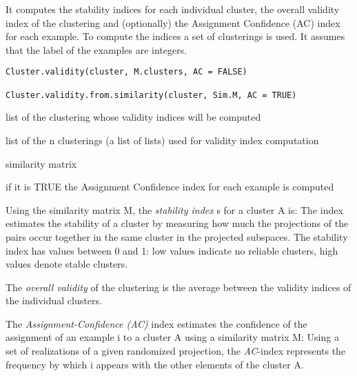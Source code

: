 \documentclass{article}
\begin{document}
\begin{Description}\relax
It computes the stability indices for each individual cluster,
the overall validity index of the clustering and (optionally) the Assignment Confidence (AC) index for each example.
To compute the indices a set of clusterings is used.
It assumes that the label of the examples are integers.
\end{Description}
\begin{Usage}
\begin{verbatim}
Cluster.validity(cluster, M.clusters, AC = FALSE)

Cluster.validity.from.similarity(cluster, Sim.M, AC = TRUE)
\end{verbatim}
\end{Usage}
\begin{Arguments}
\begin{ldescription}
\item[\code{cluster}] list of the  clustering whose validity indices will be computed 
\item[\code{M.clusters}] list of the n clusterings (a list of lists) used for validity index computation 
\item[\code{Sim.M}] similarity matrix
\item[\code{AC}] if it is TRUE the Assignment Confidence index for each example is computed
\end{ldescription}
\end{Arguments}
\begin{Details}\relax
Using the  similarity matrix M, 
the \emph{stability index} s for a cluster A is:
The index  estimates the stability of a cluster  by measuring how much  the projections 
of the pairs  occur together in the same cluster in the projected subspaces. 
The stability index has values between 0 and 1: low values indicate no reliable clusters,
high values denote stable clusters. 

The \emph{overall validity} of the clustering is the average between the validity indices of the individual clusters.

The \emph{Assignment-Confidence (AC)} index estimates the confidence of the assignment of an example i to a cluster 
A using a similarity matrix M:
Using a set of realizations of a given randomized projection, the  \emph{AC}-index represents the frequency by 
which i appears with the other  elements of the cluster A.
\end{Details}
\end{document}
